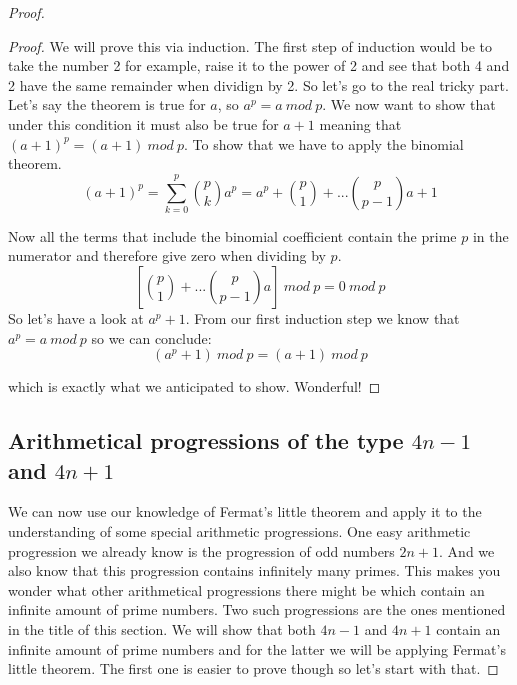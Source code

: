 \documentclass{article}
\theoremstyle{definition}
\begin{document}
\begin{proof}
\begin{proof}
    We will prove this via induction. The first step of induction would be to take the number 2 for example, raise it to the power of 2 and see that both 4 and 2 have the same remainder when dividign by 2. So let's go to the real tricky part.
    \newline 
    Let's say the theorem is true for $a$, so $a^p = a \: mod \: p$. We now want to show that under this condition it must also be true for $a+1$ meaning that $(a+1)^p = (a+1) \: mod \: p$. To show that we have to apply the binomial theorem.
    \begin{equation}
        (a+1)^p = \sum _{k=0}^p \binom{p}{k}a^p = a^p +  \binom{p}{1}+...\binom{p}{p-1}a + 1
    \end{equation}

    Now all the terms that include the binomial coefficient contain the prime $p$ in the numerator and therefore give zero when dividing by $p$. 
    \begin{equation}
        \left[ \binom{p}{1}+...\binom{p}{p-1}a \right] \: mod \: p = 0 \: mod \: p
    \end{equation}
    So let's have a look at $a^p+1$. From our first induction step we know that $a^p = a \: mod \: p$ so we can conclude:
    \begin{equation}
        (a^p + 1 ) \: mod \: p = (a+1)\: mod \: p
    \end{equation}

    which is exactly what we anticipated to show. Wonderful!
    
\end{proof}

\subsection{Arithmetical progressions of the type $4n-1$ and $4n+1$}
We can now use our knowledge of Fermat's little theorem and apply it to the understanding of some special arithmetic progressions. One easy arithmetic progression we already know is the progression of odd numbers $2n+1$. And we also know that this progression contains infinitely many primes. This makes you wonder what other arithmetical progressions there might be which contain an infinite amount of prime numbers. Two such progressions are the ones mentioned in the title of this section. We will show that both $4n-1$ and $4n+1$ contain an infinite amount of prime numbers and for the latter we will be applying Fermat's little theorem. The first one is easier to prove though so let's start with that.


\end{proof}
\end{document}
